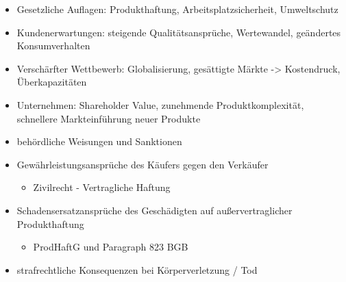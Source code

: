 \documentclass[12pt]{article}
\begin{document}
\begin{note}

    \begin{field}
        \begin{itemize}
            \item Gesetzliche Auflagen: Produkthaftung, Arbeitsplatzsicherheit, Umweltschutz
            \item Kundenerwartungen: steigende Qualitätsansprüche, Wertewandel, geändertes Konsumverhalten
            \item Verschärfter Wettbewerb: Globalisierung, gesättigte Märkte -> Kostendruck, Überkapazitäten
            \item Unternehmen: Shareholder Value, zunehmende Produktkomplexität, schnellere Markteinführung neuer Produkte
        \end{itemize}
    \end{field}
\end{note}


\begin{note}

    \begin{field}
        \begin{itemize}
            \item behördliche Weisungen und Sanktionen
            \item Gewährleistungsansprüche des Käufers gegen den Verkäufer
                \begin{itemize}
                    \item Zivilrecht - Vertragliche Haftung
                \end{itemize}
            \item Schadensersatzansprüche des Geschädigten auf außervertraglicher Produkthaftung
                \begin{itemize}
                    \item ProdHaftG und Paragraph 823 BGB
                \end{itemize}
            \item strafrechtliche Konsequenzen bei Körperverletzung / Tod
        \end{itemize}
    \end{field}
\end{note}
\end{document}
